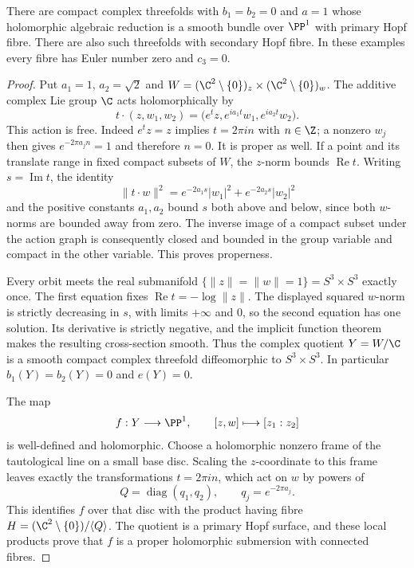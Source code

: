 \begin{example}
\label{st:C.3.6}
There are compact complex threefolds with $b_1=b_2=0$ and $a=1$
whose holomorphic algebraic reduction is a smooth bundle over
$\PP^1$ with primary Hopf fibre. There are also such threefolds
with secondary Hopf fibre. In these examples every fibre has Euler
number zero and $c_3=0$.
\end{example}
\begin{proof}
Put $a_1=1$, $a_2=\sqrt2$ and
$W=(\C^2\setminus\{0\})_z\times(\C^2\setminus\{0\})_w$.
The additive complex Lie group $\C$ acts holomorphically by
\[
t\cdot(z,w_1,w_2)
 =\bigl(e^t z,e^{ia_1t}w_1,e^{ia_2t}w_2\bigr).
\tag{C.H.1}
\]
This action is free. Indeed $e^t z=z$ implies $t=2\pi in$ with
$n\in\Z$; a nonzero $w_j$ then gives $e^{-2\pi a_jn}=1$ and
therefore $n=0$. It is proper as well. If a point and its translate
range in fixed compact subsets of $W$, the $z$-norm bounds
$\operatorname{Re}t$. Writing $s=\operatorname{Im}t$, the identity
\[
\|t\cdot w\|^2
 =e^{-2a_1s}|w_1|^2+e^{-2a_2s}|w_2|^2
\]
and the positive constants $a_1,a_2$ bound $s$ both above and
below, since both $w$-norms are bounded away from zero. The inverse
image of a compact subset under the action graph is consequently
closed and bounded in the group variable and compact in the other
variable. This proves properness.

Every orbit meets the real submanifold
$\{\|z\|=\|w\|=1\}=S^3\times S^3$ exactly once.
The first equation fixes $\operatorname{Re}t=-\log\|z\|$.
The displayed squared $w$-norm is strictly decreasing in $s$,
with limits $+\infty$ and $0$, so the second equation has one
solution. Its derivative is strictly negative, and the implicit
function theorem makes the resulting cross-section smooth.
Thus the complex quotient $Y=W/\C$ is a smooth compact complex
threefold diffeomorphic to $S^3\times S^3$. In particular
$b_1(Y)=b_2(Y)=0$ and $e(Y)=0$.

The map
\[
f:Y\longrightarrow\PP^1,\qquad [z,w]\longmapsto[z_1:z_2]
\]
is well-defined and holomorphic. Choose a holomorphic nonzero
frame of the tautological line on a small base disc. Scaling the
$z$-coordinate to this frame leaves exactly the transformations
$t=2\pi in$, which act on $w$ by powers of
\[
Q=\operatorname{diag}(q_1,q_2),\qquad
q_j=e^{-2\pi a_j}.
\]
This identifies $f$ over that disc with the product having fibre
$H=(\C^2\setminus\{0\})/\langle Q\rangle$.
The quotient is a primary Hopf surface, and these local products
prove that $f$ is a proper holomorphic submersion with connected
fibres.


\end{proof}
